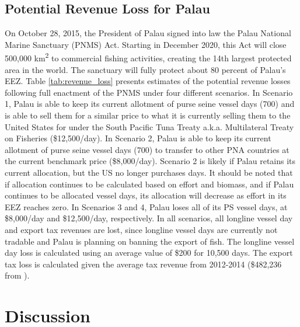 \documentclass[9p,twocolumn,twoside,lineno]{pnas-new}
\begin{document}
\subsection{Potential Revenue Loss for Palau}

On October 28, 2015, the President of Palau signed into law the Palau National Marine Sanctuary (PNMS) Act. Starting in December 2020, this Act will close 500,000 km\textsuperscript{2} to commercial fishing activities, creating the 14th largest protected area in the world. The sanctuary will fully protect about 80 percent of Palau’s EEZ. Table \ref{tab:revenue_loss} presents estimates of the potential revenue losses following full enactment of the PNMS under four different scenarios. In Scenario 1, Palau is able to keep its current allotment of purse seine vessel days (700) and is able to sell them for a similar price to what it is currently selling them to the United States for under the South Pacific Tuna Treaty a.k.a. Multilateral Treaty on Fisheries (\$12,500/day). In Scenario 2, Palau is able to keep its current allotment of purse seine vessel days (700) to transfer to other PNA countries at the current benchmark price (\$8,000/day). Scenario 2 is likely if Palau retains its current allocation, but the US no longer purchases days.  It should be noted that if allocation continues to be calculated based on effort and biomass, and if Palau continues to be allocated vessel days, its allocation will decrease as effort in its EEZ reaches zero. In Scenarios 3 and 4, Palau loses all of its PS vessel days, at \$8,000/day and \$12,500/day, respectively. In all scenarios, all longline vessel day and export tax revenues are lost,
since longline vessel days are currently not tradable and Palau is planning on banning the export of fish. The longline vessel day loss is calculated using an average value of \$200 for 10,500 days. The export tax loss is calculated given the average tax revenue from 2012-2014 (\$482,236  from \cite{Gillett2016}). 



\section{Discussion}
\end{document}
